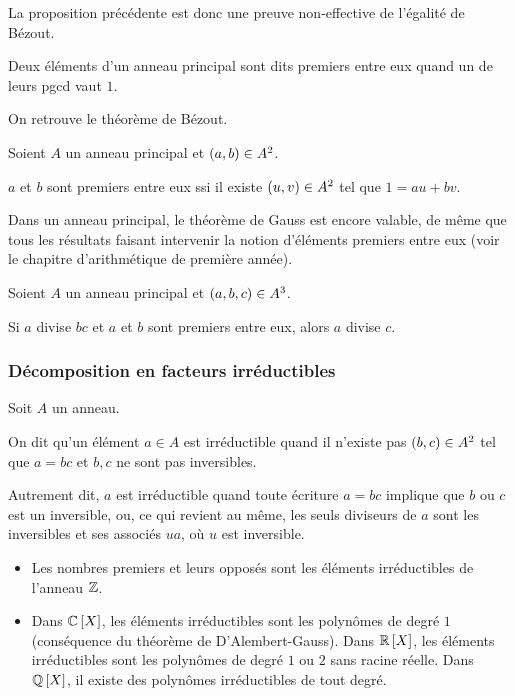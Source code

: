 La proposition précédente est donc une preuve non-effective de l'égalité de Bézout.

\begin{defi}
Deux éléments d'un anneau principal sont dits premiers entre eux quand un de leurs pgcd vaut \(1\).
\end{defi}

On retrouve le théorème de Bézout.

\begin{theo}
Soient \(A\) un anneau principal et \(\left(a,b\right)\in A^2\).

\(a\) et \(b\) sont premiers entre eux ssi il existe \(\left(u,v\right)\in A^2\) tel que \(1=au+bv\).
\end{theo}

Dans un anneau principal, le théorème de Gauss est encore valable, de même que tous les résultats faisant intervenir la notion d'éléments premiers entre eux (voir le chapitre d'arithmétique de première année).

\begin{theo}
Soient \(A\) un anneau principal et \(\left(a,b,c\right)\in A^3\).

Si \(a\) divise \(bc\) et \(a\) et \(b\) sont premiers entre eux, alors \(a\) divise \(c\).
\end{theo}

\subsubsection{Décomposition en facteurs irréductibles}

\begin{defi}
Soit \(A\) un anneau.

On dit qu'un élément \(a\in A\) est irréductible quand il n'existe pas \(\left(b,c\right)\in A^2\) tel que \(a=bc\) et \(b,c\) ne sont pas inversibles.
\end{defi}

Autrement dit, \(a\) est irréductible quand toute écriture \(a=bc\) implique que \(b\) ou \(c\) est un inversible, ou, ce qui revient au même, les seuls diviseurs de \(a\) sont les inversibles et ses associés \(ua\), où \(u\) est inversible.

\begin{ex}
\begin{itemize}
    \item Les nombres premiers et leurs opposés sont les éléments irréductibles de l'anneau \(\mathbb{Z}\). \\
    \item Dans \(\poly[\C]\), les éléments irréductibles sont les polynômes de degré \(1\) (conséquence du théorème de D'Alembert-Gauss). Dans \(\poly[\R]\), les éléments irréductibles sont les polynômes de degré \(1\) ou \(2\) sans racine réelle. Dans \(\poly[\Q]\), il existe des polynômes irréductibles de tout degré.
\end{itemize}
\end{ex}

